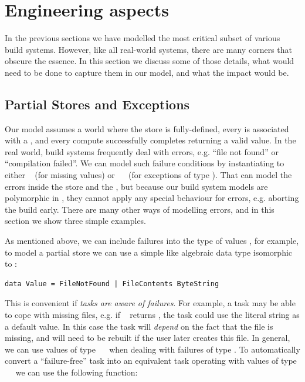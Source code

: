 \section{Engineering aspects}\label{sec-engineering}

In the previous sections we have modelled the most critical subset of various
build systems. However, like all real-world systems, there are many corners that
obscure the essence. In this section we discuss some of those details, what
would need to be done to capture them in our model, and what the impact would be.

\subsection{Partial Stores and Exceptions}\label{sec-failures}

Our model assumes a world where the store is fully-defined, every  is
associated with a , and every compute successfully completes returning a
valid value. In the real world, build systems frequently deal with errors, e.g.
``file not found'' or ``compilation failed''. We can model such failure
conditions by instantiating  to either ~ (for missing
values) or ~~ (for exceptions of type ). That can
model the errors inside the store and the , but because our build
system models are polymorphic in , they cannot apply any special behaviour
for errors, e.g. aborting the build early. There are many other ways of
modelling errors, and in this section we show three simple examples.

As mentioned above, we can include failures into the type of values , for
example, to model a partial store we can use a simple like algebraic data type
isomorphic to :

\vspace{1mm}
\begin{verbatim}
data Value = FileNotFound | FileContents ByteString
\end{verbatim}
\vspace{1mm}

\noindent
This is convenient if \emph{tasks are aware of failures}. For example, a task
may be able to cope with missing files, e.g. if ~
returns , the task could use the literal string  as
a default value. In this case the task will \emph{depend} on the fact that the
file  is missing, and will need to be rebuilt if the user
later creates this file. In general, we can use values of type
~~ when dealing with failures of type . To
automatically convert a ``failure-free'' task into an equivalent task operating
with values of type ~~ we can use the following function:

